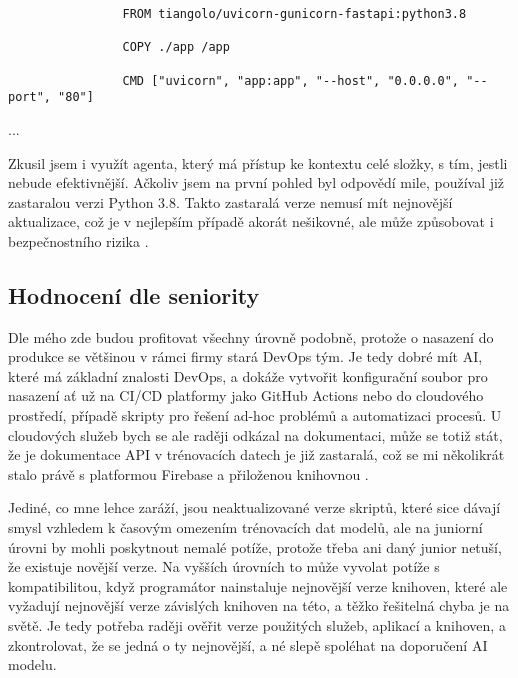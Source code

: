 \documentclass[FM,DP]{tulthesis}
\begin{document}
		\vspace{0.6em}
		\begin{tcolorbox}[colback=white,colframe=black,title=Soubor pro spuštení docker kontejneru]
			\begin{lstlisting}
				FROM tiangolo/uvicorn-gunicorn-fastapi:python3.8
				
				COPY ./app /app
				
				CMD ["uvicorn", "app:app", "--host", "0.0.0.0", "--port", "80"]
			\end{lstlisting}
			... \cite{agent_deploy}
		\end{tcolorbox}
		\vspace{0.6em}
		
		Zkusil jsem i využít agenta, který má přístup ke kontextu celé složky, s tím, jestli nebude efektivnější. Ačkoliv jsem na první pohled byl odpovědí mile, používal již zastaralou verzi Python 3.8. Takto zastaralá verze nemusí mít nejnovější aktualizace, což je v nejlepším případě akorát nešikovné, ale může způsobovat i bezpečnostního rizika \cite{agent_deploy}.
		
		\subsection{Hodnocení dle seniority}
		Dle mého zde budou profitovat všechny úrovně podobně, protože o nasazení do produkce se většinou v rámci firmy stará DevOps tým. Je tedy dobré mít AI, které má základní znalosti DevOps, a dokáže vytvořit konfigurační soubor pro nasazení ať už na CI/CD platformy jako GitHub Actions nebo do cloudového prostředí, případě skripty pro řešení ad-hoc problémů a automatizaci procesů. U cloudových služeb bych se ale raději odkázal na dokumentaci, může se totiž stát, že je dokumentace API v trénovacích datech je již zastaralá, což se mi několikrát stalo právě s platformou Firebase a přiloženou knihovnou \cite{firebase} \cite{cicd} \cite{cicd2}.
		
		Jediné, co mne lehce zaráží, jsou neaktualizované verze skriptů, které sice dávají smysl vzhledem k časovým omezením trénovacích dat modelů, ale na juniorní úrovni by mohli poskytnout nemalé potíže, protože třeba ani daný junior netuší, že existuje novější verze. Na vyšších úrovních to může vyvolat potíže s kompatibilitou, když programátor nainstaluje nejnovější verze knihoven, které ale vyžadují nejnovější verze závislých knihoven na této, a těžko řešitelná chyba je na světě.  Je tedy potřeba raději ověřit verze použitých služeb, aplikací a knihoven, a zkontrolovat, že se jedná o ty nejnovější, a né slepě spoléhat na doporučení AI modelu.
		
\end{document}
